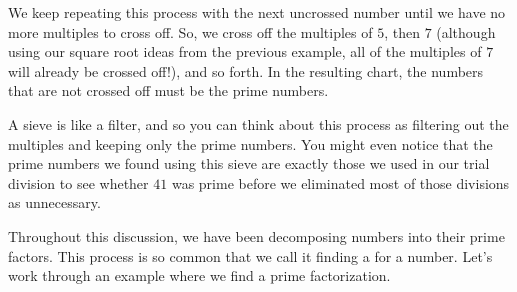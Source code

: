 \documentclass{ximera}
\begin{document}
\begin{example}
\begin{image}
 \end{image}
We keep repeating this process with the next uncrossed number until we have no more multiples to cross off. So, we cross off the multiples of $5$, then $7$ (although using our square root ideas from the previous example, all of the multiples of $7$ will already be crossed off!), and so forth. In the resulting chart, the numbers that are not crossed off must be the prime numbers.


\begin{image}
\end{image}
A sieve is like a filter, and so you can think about this process as filtering out the multiples and keeping only the prime numbers. You might even notice that the prime numbers we found using this sieve are exactly those we used in our trial division to see whether $41$ was prime before we eliminated most of those divisions as unnecessary.
\end{example}

Throughout this discussion, we have been decomposing numbers into their prime factors. This process is so common that we call it finding a  for a number. Let's work through an example where we find a prime factorization.
\end{document}
